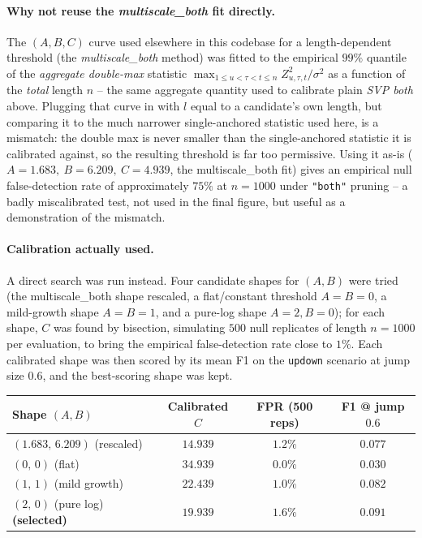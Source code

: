 \documentclass[11pt]{article}
\begin{document}
\paragraph{Why not reuse the \emph{multiscale\_both} fit directly.} The
$(A,B,C)$ curve used elsewhere in this codebase for a length-dependent
threshold (the \emph{multiscale\_both} method) was fitted to the empirical
$99\%$ quantile of the \emph{aggregate double-max} statistic
$\max_{1\le u<\tau<t\le n} Z_{u,\tau,t}^2/\sigma^2$ as a function of the
\emph{total} length $n$ -- the same aggregate quantity used to calibrate
plain \emph{SVP both} above. Plugging that curve in with $l$ equal to a
candidate's own length, but comparing it to the much narrower
single-anchored statistic used here, is a mismatch: the double max is never
smaller than the single-anchored statistic it is calibrated against, so the
resulting threshold is far too permissive. Using it as-is
($A=1.683,\ B=6.209,\ C=4.939$, the multiscale\_both fit) gives an
empirical null false-detection rate of approximately $75\%$ at $n=1000$
under \texttt{"both"} pruning -- a badly miscalibrated test, not used in
the final figure, but useful as a demonstration of the mismatch.

\paragraph{Calibration actually used.} A direct search was run instead.
Four candidate shapes for $(A,B)$ were tried (the multiscale\_both shape
rescaled, a flat/constant threshold $A=B=0$, a mild-growth shape $A=B=1$,
and a pure-log shape $A=2,B=0$); for each shape, $C$ was found by
bisection, simulating $500$ null replicates of length $n=1000$ per
evaluation, to bring the empirical false-detection rate close to $1\%$.
Each calibrated shape was then scored by its mean F1 on the
\texttt{updown} scenario at jump size $0.6$, and the best-scoring shape was
kept.

\begin{center}
\begin{tabular}{lccc}
\toprule
Shape $(A,B)$ & Calibrated $C$ & FPR (500 reps) & F1 @ jump $0.6$ \\
\midrule
$(1.683,\,6.209)$ (rescaled) & $14.939$ & $1.2\%$ & $0.077$ \\
$(0,\,0)$ (flat)             & $34.939$ & $0.0\%$ & $0.030$ \\
$(1,\,1)$ (mild growth)      & $22.439$ & $1.0\%$ & $0.082$ \\
$(2,\,0)$ (pure log) \textbf{(selected)} & $19.939$ & $1.6\%$ & $0.091$ \\
\bottomrule
\end{tabular}
\end{center}
\end{document}
